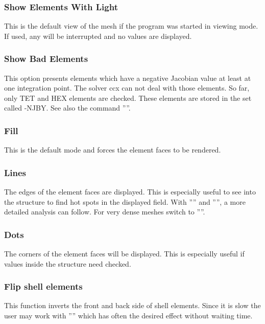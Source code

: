 \documentclass{article}
\begin{document}
\subsubsection{\label{Show Elements With Light}Show Elements With Light}
This is the default view of the mesh if the program was started in viewing mode. If used, any  will be interrupted and no values are displayed.  

\subsubsection{\label{Show Bad Elements}Show Bad Elements}
This option presents elements which have a negative Jacobian value at least at one integration point. The solver ccx can not deal with those elements. So far, only TET and HEX elements are checked. These elements are stored in the set called -NJBY. See also the command ''''.

\subsubsection{\label{Fill}Fill}
This is the default mode and forces the element faces to be rendered.

\subsubsection{\label{Lines}Lines}
The edges of the element faces are displayed. This is especially useful to see into the structure to find hot spots in the displayed field. With '''' and '''', a more detailed analysis can follow. For very dense meshes switch to ''''.

\subsubsection{\label{Dots}Dots}
The corners of the element faces will be displayed. This is especially useful if values inside the structure need checked.

\subsubsection{\label{Flip shell elements}Flip shell elements}
This function inverts the front and back side of shell elements. Since it is slow the user may work with '''' which has often the desired effect without waiting time.
\end{document}
